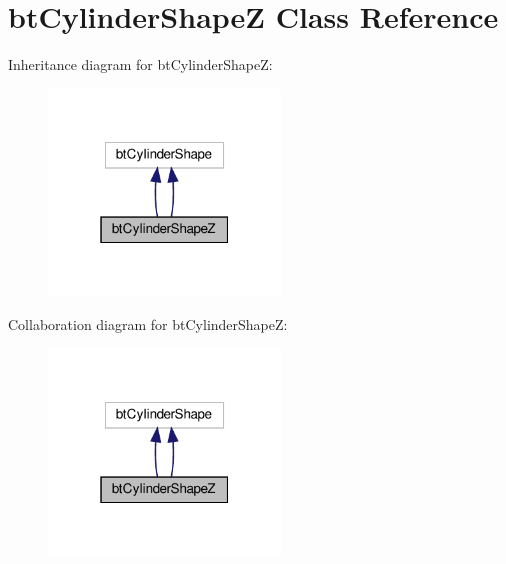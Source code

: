 \hypertarget{classbtCylinderShapeZ}{}\section{bt\+Cylinder\+ShapeZ Class Reference}
\label{classbtCylinderShapeZ}


Inheritance diagram for bt\+Cylinder\+ShapeZ\+:
\nopagebreak
\begin{figure}[H]
\begin{center}
\leavevmode
\includegraphics[width=175pt]{classbtCylinderShapeZ__inherit__graph}
\end{center}
\end{figure}


Collaboration diagram for bt\+Cylinder\+ShapeZ\+:
\nopagebreak
\begin{figure}[H]
\begin{center}
\leavevmode
\includegraphics[width=175pt]{classbtCylinderShapeZ__coll__graph}
\end{center}
\end{figure}
